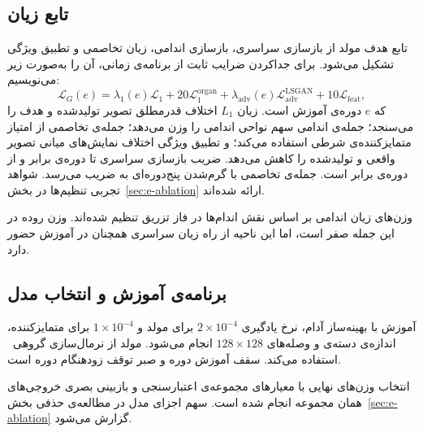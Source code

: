 \subsection{تابع زیان}
\label{sec:m-syn-loss}

تابع هدف مولد از بازسازی سراسری، بازسازی اندامی، زیان تخاصمی و تطبیق ویژگی تشکیل می‌شود. برای جداکردن ضرایب ثابت از برنامه‌ی زمانی، آن را به‌صورت زیر می‌نویسیم:
\begin{equation}
\mathcal L_G(e)=\lambda_1(e)\mathcal L_1+20\mathcal L_1^{\mathrm{organ}}+\lambda_{\mathrm{adv}}(e)\mathcal L_{\mathrm{adv}}^{\mathrm{LSGAN}}+10\mathcal L_{\mathrm{feat}},
\label{eq:m-generator-loss}
\end{equation}
که $e$ دوره‌ی آموزش است. زیان $L_1$ اختلاف قدرمطلق تصویر تولیدشده و هدف را می‌سنجد؛ جمله‌ی اندامی سهم نواحی اندامی را وزن می‌دهد؛ جمله‌ی تخاصمی از امتیاز متمایزکننده‌ی شرطی استفاده می‌کند؛ و تطبیق ویژگی اختلاف نمایش‌های میانی تصویر واقعی و تولیدشده را کاهش می‌دهد. ضریب بازسازی سراسری تا دوره‌ی  برابر  و از دوره‌ی  برابر  است. جمله‌ی تخاصمی با گرم‌شدن پنج‌دوره‌ای به ضریب  می‌رسد. شواهد تجربی تنظیم‌ها در بخش~\ref{sec:e-ablation} ارائه شده‌اند.

وزن‌های زیان اندامی بر اساس نقش اندام‌ها در فاز تزریق تنظیم شده‌اند. وزن روده در این جمله صفر است، اما این ناحیه از راه زیان سراسری همچنان در آموزش حضور دارد.

\subsection{برنامه‌ی آموزش و انتخاب مدل}
\label{sec:m-syn-train}

آموزش با بهینه‌ساز آدام، نرخ یادگیری $2\times10^{-4}$ برای مولد و $1\times10^{-4}$ برای متمایزکننده، اندازه‌ی دسته‌ی  و وصله‌های $128\times128$ انجام می‌شود. مولد از نرمال‌سازی گروهی~\cite{wu2018group} استفاده می‌کند. سقف آموزش  دوره و صبر توقف زودهنگام  دوره است.

انتخاب وزن‌های نهایی با معیارهای مجموعه‌ی اعتبارسنجی و بازبینی بصری خروجی‌های همان مجموعه انجام شده است. سهم اجزای مدل در مطالعه‌ی حذفی بخش~\ref{sec:e-ablation} گزارش می‌شود.

